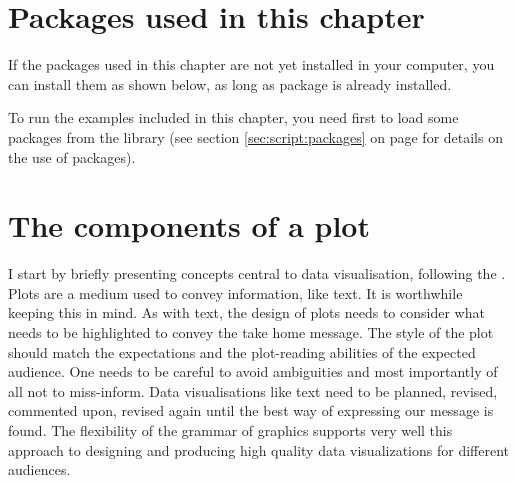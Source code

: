 \documentclass[krantz2]{krantz}\usepackage{knitr}
\begin{document}
\section{Packages used in this chapter}



If the packages used in this chapter are not yet installed in your computer, you can install them as shown below, as long as package  is already installed.

\begin{knitrout}\footnotesize
{}\color{fgcolor}\begin{kframe}
\begin{alltt}
\hlopt{::}
\end{alltt}
\end{kframe}
\end{knitrout}

To run the examples included in this chapter, you need first to load some packages from the library (see section \ref{sec:script:packages} on page \pageref{sec:script:packages} for details on the use of packages).

\begin{knitrout}\footnotesize
{}\color{fgcolor}\begin{kframe}
\begin{alltt}
\end{alltt}
\end{kframe}
\end{knitrout}





\section{The components of a plot}
I start by briefly presenting concepts central to data visualisation, following the  \autocite{Koponen2019}. Plots are a medium used to convey information, like text. It is worthwhile keeping this in mind. As with text, the design of plots needs to consider what needs to be highlighted to convey the take home message. The style of the plot should match the expectations and the plot-reading abilities of the expected audience. One needs to be careful to avoid ambiguities and most importantly of all not to miss-inform. Data visualisations like text need to be planned, revised, commented upon, revised again until the best way of expressing our message is found. The flexibility of the grammar of graphics supports very well this approach to designing and producing high quality data visualizations for different audiences.
\end{document}
